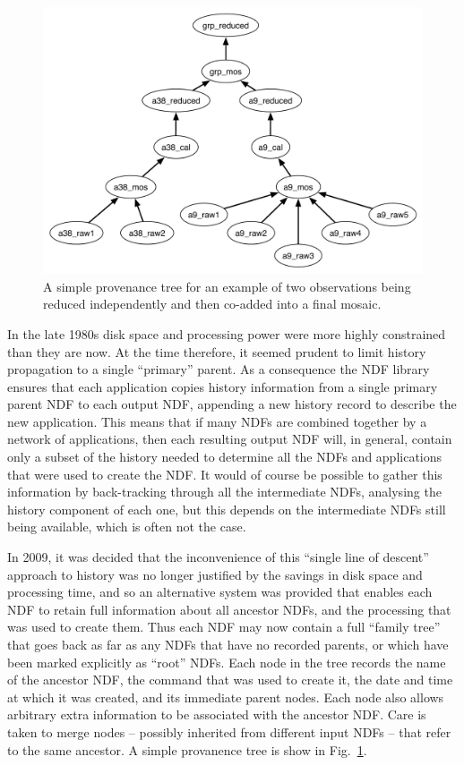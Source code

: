 \documentclass[final,authoryear,5p,times,twocolumn]{elsarticle}
\begin{document}
\begin{figure}
\includegraphics[width=\columnwidth]{provenance.pdf}
\caption{A simple provenance tree for an example of two observations
  being reduced independently and then co-added into a final
  mosaic.}
\label{fig:prov}
\end{figure}

In the late 1980s disk space and processing power were more highly
constrained than they are now. At the time therefore, it
seemed prudent to limit history propagation to a single ``primary''
parent.  As a consequence the NDF library ensures that each application
copies history information from a single primary parent NDF to each
output NDF, appending a new history record to describe the new
application. This means that if many NDFs are combined together by a
network of applications, then each resulting output NDF will, in
general, contain only a subset of the history needed to determine all
the NDFs and applications that were used to create the NDF. It would
of course be possible to gather this information by back-tracking
through all the intermediate NDFs, analysing the history component of
each one, but this depends on the intermediate NDFs still being
available, which is often not the case.

In 2009, it was decided that the inconvenience of this ``single line of
descent'' approach to history was no longer justified by the savings in
disk space and processing time, and so an alternative system was
provided that enables each NDF to retain full information about all
ancestor NDFs, and the processing that was used to create them. Thus
each NDF may now contain a full ``family tree'' that goes back as far as
any NDFs that have no recorded parents, or which have been marked
explicitly as ``root'' NDFs. Each node in the tree records the name of
the ancestor NDF, the command that was used to create it, the date and
time at which it was created, and its immediate parent nodes. Each
node also allows arbitrary extra information to be associated with the
ancestor NDF. Care is taken to merge nodes -- possibly inherited from
different input NDFs -- that refer to the same ancestor. A simple
provanence tree is show in Fig.~\ref{fig:prov}.
\end{document}
